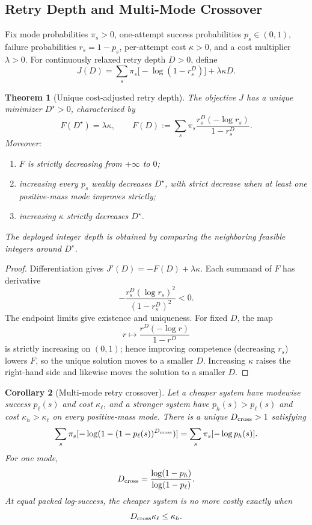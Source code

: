 \documentclass[10pt]{article}
\theoremstyle{paperplain}
\newtheorem{theorem}{Theorem}[section]
\newtheorem{corollary}[theorem]{Corollary}
\theoremstyle{paperdefinition}
\theoremstyle{paperremark}
\begin{document}
\subsection{Retry Depth and Multi-Mode Crossover}

Fix mode probabilities \(\pi_s>0\), one-attempt success probabilities
\(p_s\in(0,1)\), failure probabilities \(r_s=1-p_s\), per-attempt cost
\(\kappa>0\), and a cost multiplier \(\lambda>0\).  For continuously
relaxed retry depth \(D>0\), define
\[
  J(D)=
  \sum_s\pi_s\bigl[-\log(1-r_s^D)\bigr]
  +\lambda\kappa D.
\]

\begin{theorem}[Unique cost-adjusted retry depth]
\label{thm:unique-retry-depth}
The objective \(J\) has a unique minimizer \(D^\star>0\), characterized by
\[
  F(D^\star)=\lambda\kappa,
  \qquad
  F(D):=\sum_s\pi_s
  \frac{r_s^D(-\log r_s)}{1-r_s^D}.
\]
Moreover:
\begin{enumerate}
  \item \(F\) is strictly decreasing from \(+\infty\) to \(0\);
  \item increasing every \(p_s\) weakly decreases \(D^\star\), with strict
        decrease when at least one positive-mass mode improves strictly;
  \item increasing \(\kappa\) strictly decreases \(D^\star\).
\end{enumerate}
The deployed integer depth is obtained by comparing the neighboring feasible
integers around \(D^\star\).
\end{theorem}

\begin{proof}
Differentiation gives \(J'(D)=-F(D)+\lambda\kappa\).  Each summand of \(F\)
has derivative
\[
  -\frac{r_s^D(\log r_s)^2}{(1-r_s^D)^2}<0.
\]
The endpoint limits give existence and uniqueness.  For fixed \(D\), the
map
\[
  r\longmapsto \frac{r^D(-\log r)}{1-r^D}
\]
is strictly increasing on \((0,1)\); hence improving competence
(decreasing \(r_s\)) lowers \(F\), so the unique solution moves to a smaller
\(D\).  Increasing \(\kappa\) raises the right-hand side and likewise moves
the solution to a smaller \(D\).
\end{proof}

\begin{corollary}[Multi-mode retry crossover]
\label{cor:multi-mode-retry-crossover}
Let a cheaper system have modewise success \(p_\ell(s)\) and cost
\(\kappa_\ell\), and a stronger system have
\(p_h(s)>p_\ell(s)\) and cost \(\kappa_h>\kappa_\ell\) on every
positive-mass mode.  There is a unique \(D_{\rm cross}>1\) satisfying
\[
  \sum_s\pi_s[-\log(1-(1-p_\ell(s))^{D_{\rm cross}})]
  =
  \sum_s\pi_s[-\log p_h(s)].
\]
For one mode,
\[
  D_{\rm cross}
  =
  \frac{\log(1-p_h)}{\log(1-p_\ell)}.
\]
At equal packed log-success, the cheaper system is no more costly exactly
when
\[
  D_{\rm cross}\kappa_\ell\le\kappa_h.
\]
\end{corollary}
\end{document}
